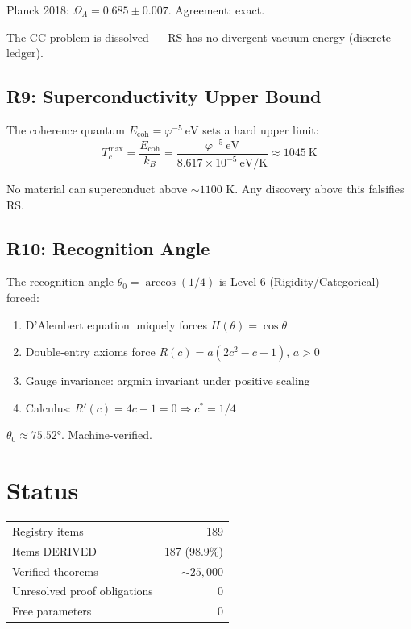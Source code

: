 \documentclass[12pt,twocolumn]{article}
\begin{document}
Planck 2018: $\Omega_\Lambda = 0.685 \pm 0.007$. Agreement: exact.

The CC problem is dissolved — RS has no divergent vacuum energy (discrete ledger).

\subsection{R9: Superconductivity Upper Bound}

The coherence quantum $E_\mathrm{coh} = \varphi^{-5}~\mathrm{eV}$ sets a hard upper limit:
\begin{equation}
T_c^\mathrm{max} = \frac{E_\mathrm{coh}}{k_B} = \frac{\varphi^{-5}~\mathrm{eV}}{8.617 \times 10^{-5}~\mathrm{eV/K}} \approx 1045~\mathrm{K}
\end{equation}

No material can superconduct above $\sim 1100$ K. Any discovery above this falsifies RS.

\subsection{R10: Recognition Angle}

The recognition angle $\theta_0 = \arccos(1/4)$ is Level-6 (Rigidity/Categorical) forced:
\begin{enumerate}
\item D'Alembert equation uniquely forces $H(\theta) = \cos\theta$
\item Double-entry axioms force $R(c) = a(2c^2 - c - 1)$, $a > 0$
\item Gauge invariance: argmin invariant under positive scaling
\item Calculus: $R'(c) = 4c - 1 = 0 \Rightarrow c^* = 1/4$
\end{enumerate}

$\theta_0 \approx 75.52°$. Machine-verified.

\section{Status}

\begin{center}
\begin{tabular}{lr}
Registry items & 189 \\
Items DERIVED & 187 (98.9\%) \\
Verified theorems & $\sim 25{,}000$ \\
Unresolved proof obligations & 0 \\
Free parameters & 0 \\
\end{tabular}
\end{center}
\end{document}
